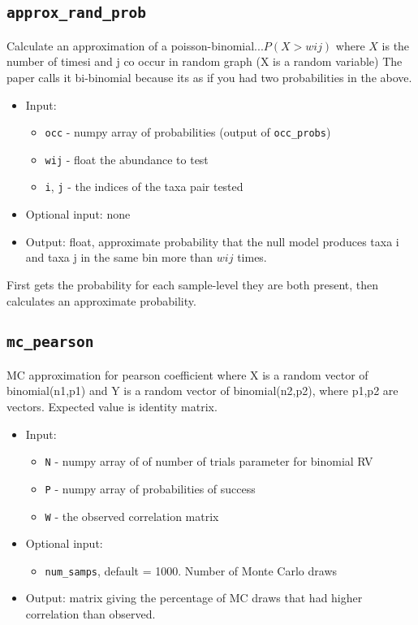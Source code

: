 \documentclass[10pt]{article}
\theoremstyle{definition}
\numberwithin{theorem}{section}
\numberwithin{definition}{section}
\numberwithin{lemma}{section}
\numberwithin{corollary}{section}
\numberwithin{clm}{section}
\numberwithin{rmk}{section}
\begin{document}
\cprotect \subsection{\verb|approx_rand_prob|}
Calculate an approximation of a poisson-binomial...$P(X > wij)$ where $X$
is the number of timesi and j co occur in random graph (X is a random variable)
The paper \cite{coocc} calls it bi-binomial because its as if you had two 
probabilities in the above.

\begin{itemize}
	\item Input: 
	\begin{itemize}
		\item \verb|occ| - numpy array of probabilities (output of \verb|occ_probs|) 
		\item \verb|wij| - float the abundance to test
		\item  \verb|i|, \verb|j| -  the indices of the taxa pair tested
	\end{itemize}
	\item Optional input: none
	\item Output: float, approximate probability that the null model produces taxa i and taxa j in the same bin more than $wij$ times.
\end{itemize}

First gets the probability for each sample-level they are both present, then calculates an approximate probability.

\cprotect \subsection{\verb|mc_pearson|}

MC approximation for pearson coefficient where X is a random vector of binomial(n1,p1)
and Y is a random vector of binomial(n2,p2), where p1,p2 are vectors. Expected value is identity matrix.

\begin{itemize}
	\item Input:
	\begin{itemize}
		\item \verb|N| - numpy array of of number of trials parameter for binomial RV
		\item  \verb|P| - numpy array of probabilities of success
		\item \verb|W| - the observed correlation matrix
	\end{itemize}
	\item Optional input: 
	\begin{itemize}
		\item \verb|num_samps|, default = 1000. Number of Monte Carlo draws
	\end{itemize}
	\item Output: matrix giving the percentage of MC draws that had higher correlation than observed.
\end{itemize}
\end{document}
